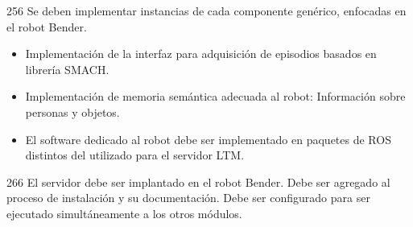 \begin{requisito-sistema}{25}{6}
	Se deben implementar instancias de cada componente genérico, enfocadas en el robot Bender.
	\begin{itemize}
		\item Implementación de la interfaz para adquisición de episodios basados en librería SMACH.
		\item Implementación de memoria semántica adecuada al robot: Información sobre personas y objetos.
		\item El software dedicado al robot debe ser implementado en paquetes de ROS distintos del utilizado para el servidor LTM.
	\end{itemize}	
\end{requisito-sistema}

\begin{requisito-sistema}{26}{6}
	El servidor debe ser implantado en el robot Bender. Debe ser agregado al proceso de instalación y su documentación. Debe ser configurado para ser ejecutado simultáneamente a los otros módulos.
\end{requisito-sistema}


